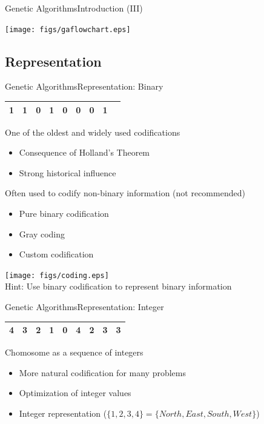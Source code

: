 \documentclass[10pt,compress]{beamer} %
\begin{document}
\begin{frame}{Genetic Algorithms}{Introduction (III)} 
	\begin{center}
		\texttt{[image: figs/gaflowchart.eps]}
	\end{center}
\end{frame}

\subsection{Representation}
\begin{frame}{Genetic Algorithms}{Representation: Binary}
	\vspace{-0.3cm}
	\begin{table}[]
	\centering
	\begin{tabular}{|l|l|l|l|l|l|l|l|l|}
	\hline
 	1 & 1 & 0 & 1 & 0 & 0 & 0 & 1\\ \hline
	\end{tabular}
	\end{table}

	One of the oldest and widely used codifications
	\begin{itemize}
		\item Consequence of Holland's Theorem
		\item Strong historical influence
  	\end{itemize}
	Often used to codify non-binary information (not recommended)
	\begin{itemize}
		\item Pure binary codification
		\item Gray coding
		\item Custom codification
	\end{itemize}
	\vspace{-1.5cm}
	\hfill\texttt{[image: figs/coding.eps]}\\
	\vspace{-0.3cm}
	Hint: Use binary codification to represent binary information
\end{frame}

\begin{frame}{Genetic Algorithms}{Representation: Integer}
	\begin{table}[]
	\centering
	\begin{tabular}{|l|l|l|l|l|l|l|l|l|}
	\hline
 	4 & 3 & 2 & 1 & 0 & 4 & 2 & 3 & 3\\ \hline
	\end{tabular}
	\end{table}

	Chomosome as a sequence of integers
	\begin{itemize}
		\item More natural codification for many problems
		\item Optimization of integer values
		\item Integer representation ($\{1,2,3,4\}=\{North,East,South,West\}$)
  	\end{itemize}
\end{frame}
\end{document}
